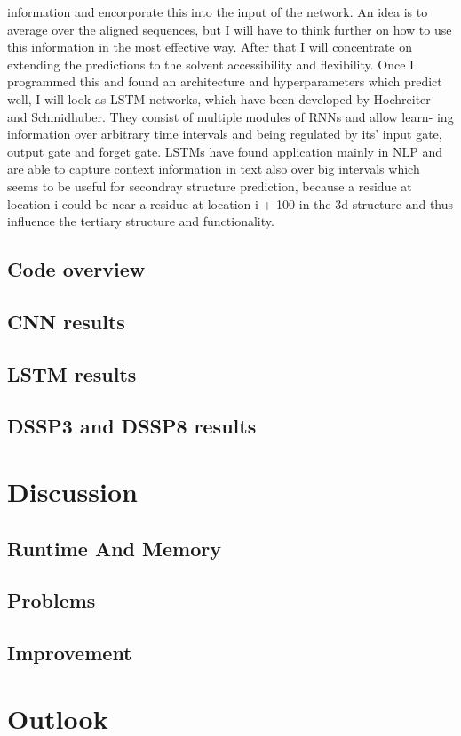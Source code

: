 \documentclass{article}
\begin{document}
information and encorporate this into the input of the network. An idea is to
average over the aligned sequences, but I will have to think further on how to
use this information in the most effective way. After that I will concentrate
on extending the predictions to the solvent accessibility and flexibility. Once I
programmed this and found an architecture and hyperparameters which predict
well, I will look as LSTM networks, which have been developed by Hochreiter
and Schmidhuber. They consist of multiple modules of RNNs and allow learn-
ing information over arbitrary time intervals and being regulated by its’ input
gate, output gate and forget gate. LSTMs have found application mainly in
NLP and are able to capture context information in text also over big intervals
which seems to be useful for secondray structure prediction, because a residue
at location i could be near a residue at location i + 100 in the 3d structure and
thus influence the tertiary structure and functionality.
\subsection{Code overview}
\subsection{CNN results}
\subsection{LSTM results}
\subsection{DSSP3 and DSSP8 results}

\section{Discussion}
\subsection{Runtime And Memory}
\subsection{Problems}
\subsection{Improvement}
\section{Outlook}
\end{document}
